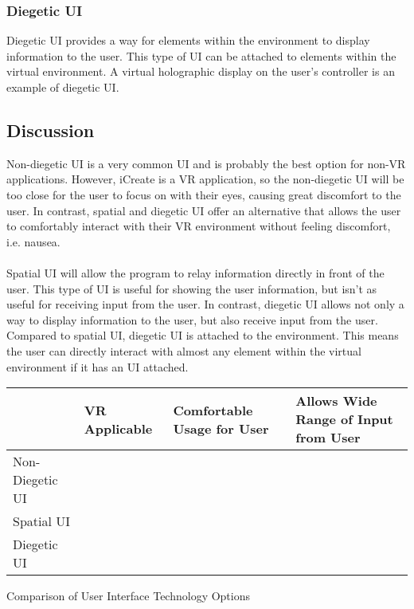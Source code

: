 \documentclass[letterpaper,10pt,onecolumn,compsoc]{IEEEtran}
\begin{document}
\subsubsection{Diegetic UI}
Diegetic UI provides a way for elements within the environment to display information to the user. This type of UI can be attached to elements within the virtual environment. A virtual holographic display on the user’s controller is an example of diegetic UI.

\subsection{Discussion}
Non-diegetic UI is a very common UI and is probably the best option for non-VR applications. However, iCreate is a VR application, so the non-diegetic UI will be too close for the user to focus on with their eyes, causing great discomfort to the user. In contrast, spatial and diegetic UI offer an alternative that allows the user to comfortably interact with their VR environment without feeling discomfort, i.e. nausea.
\\ ~ \\ \noindent 
Spatial UI will allow the program to relay information directly in front of the user. This type of UI is useful for showing the user information, but isn’t as useful for receiving input from the user. In contrast, diegetic UI allows not only a way to display information to the user, but also receive input from the user. Compared to spatial UI, diegetic UI is attached to the environment. This means the user can directly interact with almost any element within the virtual environment if it has an UI attached. 


\begin{center}
\begin{tabular}{ | P{2.5cm} | P{2.25cm} | P{4.5cm} | P{6cm} | } 
 	\hline
 	 & VR Applicable & Comfortable Usage for User & Allows Wide Range of Input from User \\ 
 	\hline
 	Non-Diegetic UI & & & \checkmark \\ 
 	\hline
 	Spatial UI & \checkmark & \checkmark &  \\ 
 	\hline
 	Diegetic UI & \checkmark & \checkmark & \checkmark \\ 
 	\hline
\end{tabular}
\end{center}

\begin{center}
Comparison of User Interface Technology Options
\end{center}
\end{document}
